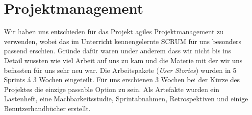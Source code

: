 \section{Projektmanagement}
Wir haben uns entschieden für das Projekt agiles Projektmanagement zu verwenden, wobei das im Unterricht kennengelernte SCRUM für uns besonders passend erschien. Gründe dafür waren under anderem dass wir nicht bis ins Detail wussten wie viel Arbeit auf uns zu kam und die Materie mit der wir uns befassten für uns sehr neu war.
\newline
Die Arbeitspakete (\textit{User Stories}) wurden in 5 Sprints á 3 Wochen eingeteilt. Für uns erschienen 3 Wochen bei der Kürze des Projektes die einzige passable Option zu sein.
Als Artefakte wurden ein Lastenheft, eine Machbarkeitsstudie, Sprintabnahmen, Retrospektiven und einige Benutzerhandbücher erstellt.